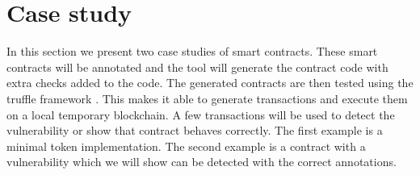 \documentclass[a4paper]{article}
\begin{document}
\newpage
\section{Case study}
\label{sec:casestudy}
In this section we present two case studies of smart contracts. These smart contracts will be annotated and the tool will generate the contract code with extra checks added to the code. The generated contracts are then tested using the truffle framework \cite{truffleframework}. This makes it able to generate transactions and execute them on a local temporary blockchain. A few transactions will be used to detect the vulnerability or show that contract behaves correctly. The first example is a minimal token implementation. The second example is a contract with a vulnerability which we will show can be detected with the correct annotations.
\end{document}
